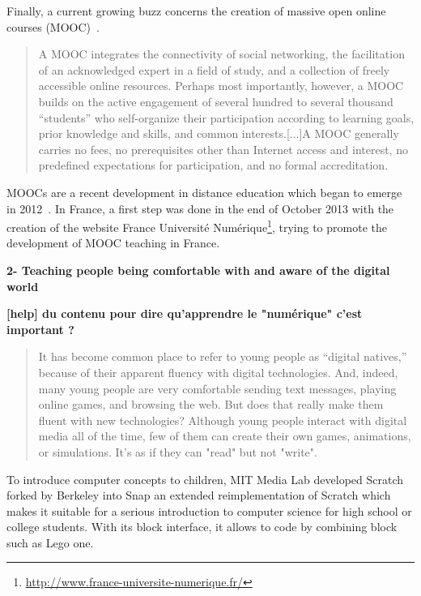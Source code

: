 Finally, a current growing buzz concerns the creation of massive open online courses (MOOC)~\cite{mackness2010ideals}.

\begin{quotation}
    A MOOC integrates the connectivity of social networking, the facilitation of an acknowledged expert in a field of study, and a collection of freely accessible online resources. Perhaps most importantly, however, a MOOC builds on the active engagement of several hundred to several thousand “students” who self-organize their participation according to learning goals, prior knowledge and skills, and common interests.[...]A MOOC generally carries no fees, no prerequisites other than Internet access and interest, no predefined expectations for participation, and no formal accreditation.
\end{quotation}

MOOCs are a recent development in distance education which began to emerge in 2012~\cite{pappano2012year}. In France, a first step was done in the end of October 2013 with the creation of the website France Université Numérique\footnote{\url{http://www.france-universite-numerique.fr/}}, trying to promote the development of MOOC teaching in France.


\textbf{2- Teaching people being comfortable with and aware of the digital world}

\textbf{[help] du contenu pour dire qu'apprendre le "numérique" c'est important ?}

\begin{quotation}

    It has become common place to refer to young people as “digital natives,” because of their apparent fluency with digital technologies. And, indeed, many young people are very comfortable sending text messages, playing online games, and browsing the web. But does that really make them fluent with new technologies? Although young people interact with digital media all of the time, few of them can create their own games, animations, or simulations. It’s as if they can "read" but not "write".

\end{quotation}

To introduce computer concepts to children, MIT Media Lab developed Scratch~\cite{resnick2009scratch} forked by Berkeley into Snap an extended reimplementation of Scratch which makes it suitable for a serious introduction to computer science for high school or college students. With its block interface, it allows to code by combining block such as Lego one.

